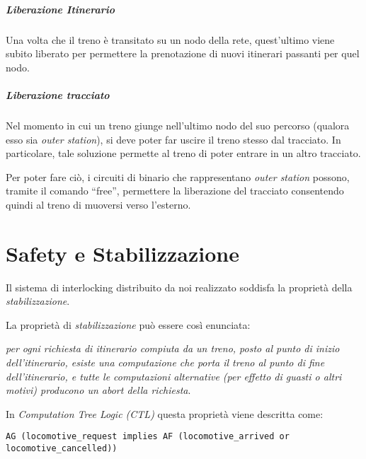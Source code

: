 \documentclass[10pt,a4paper,oneside]{report}
\begin{document}
\paragraph*{Liberazione Itinerario}
Una volta che il treno è transitato su un nodo della rete, quest'ultimo viene subito liberato per permettere la prenotazione di nuovi itinerari passanti per quel nodo.
\paragraph*{Liberazione tracciato}
Nel momento in cui un treno giunge nell'ultimo nodo del suo percorso (qualora esso sia \emph{outer station}), si deve poter far uscire il treno stesso dal tracciato.
In particolare, tale soluzione permette al treno di poter entrare in un altro tracciato.

Per poter fare ciò, i circuiti di binario che rappresentano \emph{outer station} possono, tramite il comando ``free'', permettere la liberazione del tracciato consentendo quindi al treno di muoversi verso l'esterno.





\chapter{Safety e Stabilizzazione}
\label{cap:properties}
Il sistema di interlocking distribuito da noi realizzato soddisfa la proprietà della \emph{stabilizzazione}.

La proprietà di \emph{stabilizzazione} può essere così enunciata:

\textit{per ogni richiesta di itinerario compiuta da un treno, posto al punto di inizio dell'itinerario, esiste una computazione che porta il treno al punto di fine dell'itinerario, e tutte le computazioni alternative (per effetto di guasti o altri motivi) producono un \emph{abort della richiesta}}.

In \emph{Computation Tree Logic (CTL)} questa proprietà viene descritta come:
\begin{lstlisting}
AG (locomotive_request implies AF (locomotive_arrived or locomotive_cancelled))
\end{lstlisting}
\end{document}
